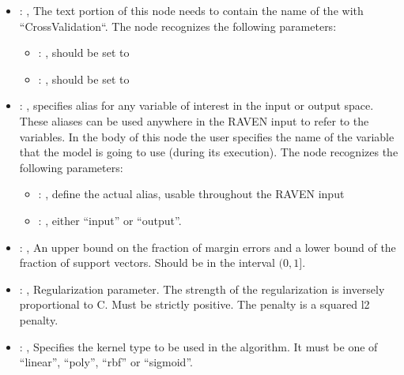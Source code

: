 \begin{itemize}
    \item {}: , 
      The text portion of this node needs to contain the name of the  with
               ``CrossValidation``.
      The  node recognizes the following parameters:
        \begin{itemize}
          \item {}: , 
            should be set to 
          \item {}: , 
            should be set to 
      \end{itemize}

    \item {}: , 
      specifies alias for         any variable of interest in the input or output space. These
      aliases can be used anywhere in the RAVEN input to         refer to the variables. In the body
      of this node the user specifies the name of the variable that the model is going to use
      (during its execution).
      The  node recognizes the following parameters:
        \begin{itemize}
          \item {}: , 
            define the actual alias, usable throughout the RAVEN input
          \item {}: , 
            either ``input'' or ``output''.
      \end{itemize}

    \item {}: , 
      An upper bound on the fraction of margin errors and
      a lower bound of the fraction of support vectors. Should be in the interval $(0, 1]$.

    \item {}: , 
      Regularization parameter. The strength of the regularization is inversely
      proportional to C.                                                           Must be strictly
      positive. The penalty is a squared l2 penalty.

    \item {}: , 
      Specifies the kernel type to be used in the algorithm. It must be one of
      ``linear'', ``poly'', ``rbf'' or ``sigmoid''.


\end{itemize}
